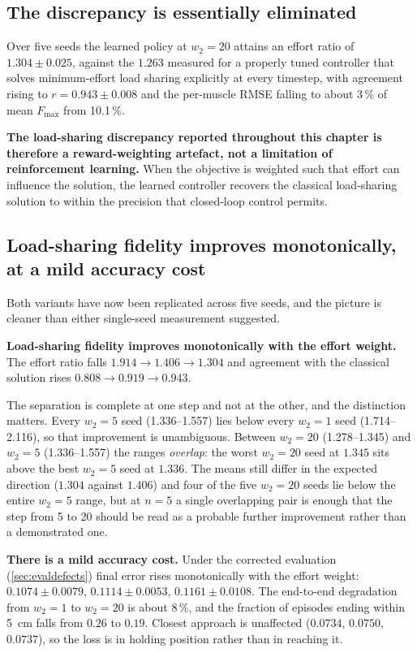 \subsection{The discrepancy is essentially eliminated}

Over five seeds the learned policy at $w_2 = 20$ attains an effort ratio of
$1.304 \pm 0.025$, against the $1.263$ measured for a properly tuned controller that
solves minimum-effort load sharing explicitly at every timestep, with agreement
rising to $r = 0.943 \pm 0.008$ and the per-muscle RMSE falling to about 3\,\% of
mean $F_{\max}$ from 10.1\,\%.

\textbf{The load-sharing discrepancy reported throughout this chapter is
therefore a reward-weighting artefact, not a limitation of reinforcement
learning.} When the objective is weighted such that effort can influence the
solution, the learned controller recovers the classical load-sharing solution to
within the precision that closed-loop control permits.

\subsection{Load-sharing fidelity improves monotonically, at a mild accuracy cost}

Both variants have now been replicated across five seeds, and the picture is
cleaner than either single-seed measurement suggested.

\textbf{Load-sharing fidelity improves monotonically with the effort weight.}
The effort ratio falls $1.914 \rightarrow 1.406 \rightarrow 1.304$ and agreement
with the classical solution rises $0.808 \rightarrow 0.919 \rightarrow 0.943$.

The separation is complete at one step and not at the other, and the distinction
matters. Every $w_2 = 5$ seed (1.336--1.557) lies below every $w_2 = 1$ seed
(1.714--2.116), so that improvement is unambiguous. Between $w_2 = 20$
(1.278--1.345) and $w_2 = 5$ (1.336--1.557) the ranges \emph{overlap}: the worst
$w_2 = 20$ seed at $1.345$ sits above the best $w_2 = 5$ seed at $1.336$. The
means still differ in the expected direction ($1.304$ against $1.406$) and four
of the five $w_2 = 20$ seeds lie below the entire $w_2 = 5$ range, but at $n = 5$
a single overlapping pair is enough that the step from 5 to 20 should be read as
a probable further improvement rather than a demonstrated one.

\textbf{There is a mild accuracy cost.} Under the corrected evaluation
(\cref{sec:evaldefects}) final error rises monotonically with the effort weight:
$0.1074 \pm 0.0079$, $0.1114 \pm 0.0053$, $0.1161 \pm 0.0108$. The end-to-end
degradation from $w_2 = 1$ to $w_2 = 20$ is about 8\,\%, and the fraction of
episodes ending within \SI{5}{\centi\meter} falls from $0.26$ to $0.19$. Closest
approach is unaffected ($0.0734$, $0.0750$, $0.0737$), so the loss is in holding
position rather than in reaching it.

